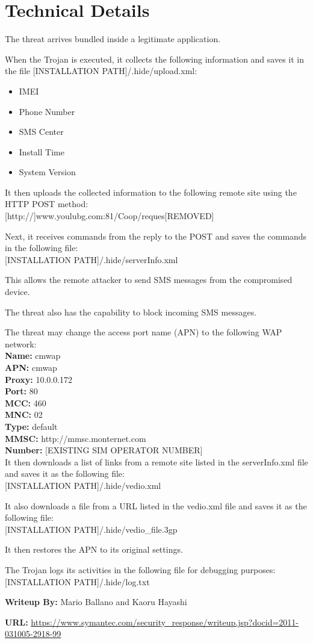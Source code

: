 \section{Technical Details}

The threat arrives bundled inside a legitimate application.

When the Trojan is executed, it collects the following information and saves it in the file [INSTALLATION PATH]/.hide/upload.xml:
\begin{itemize}
	\item IMEI
	\item Phone Number
	\item SMS Center
	\item Install Time
	\item System Version
\end{itemize}

It then uploads the collected information to the following remote site using the HTTP POST method: \\
{[}http://{]}www.youlubg.com:81/Coop/reques[REMOVED]

Next, it receives commands from the reply to the POST and saves the commands in the following file: \\
{[}INSTALLATION PATH{]}/.hide/serverInfo.xml

This allows the remote attacker to send SMS messages from the compromised device.

The threat also has the capability to block incoming SMS messages.

The threat may change the access port name (APN) to the following WAP network: \\
\textbf{Name:} cmwap \\
\textbf{APN:} cmwap \\
\textbf{Proxy:} 10.0.0.172 \\
\textbf{Port:} 80 \\
\textbf{MCC:} 460 \\
\textbf{MNC:} 02 \\
\textbf{Type:} default \\
\textbf{MMSC:} http://mmsc.monternet.com \\
\textbf{Number:} [EXISTING SIM OPERATOR NUMBER] \\

It then downloads a list of links from a remote site listed in the serverInfo.xml file and saves it as the following file: \\
{[}INSTALLATION PATH{]}/.hide/vedio.xml

It also downloads a file from a URL listed in the vedio.xml file and saves it as the following file: \\
{[}INSTALLATION PATH{]}/.hide/vedio\_file.3gp

It then restores the APN to its original settings.

The Trojan logs its activities in the following file for debugging purposes: \\
{[}INSTALLATION PATH{]}/.hide/log.txt

\textbf{Writeup By:} Mario Ballano and Kaoru Hayashi

\textbf{URL:} \url{https://www.symantec.com/security_response/writeup.jsp?docid=2011-031005-2918-99}